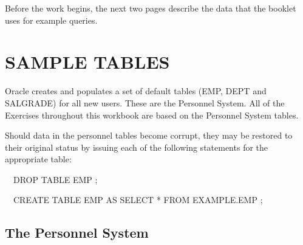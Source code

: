 Before the work begins, the next two pages describe the data that the booklet uses for example queries.

\clearpage
\section{SAMPLE TABLES}
Oracle creates and populates a set of default tables (EMP, DEPT and SALGRADE) for all new users. These are the Personnel System. All of the Exercises throughout this workbook are based on the Personnel System tables.

Should data in the personnel tables become corrupt, they may be restored to their original status by issuing each of the following statements for the appropriate table:

\ \ DROP TABLE EMP ;

\ \ CREATE TABLE EMP AS SELECT * FROM EXAMPLE.EMP ;

\subsection{The Personnel System}
